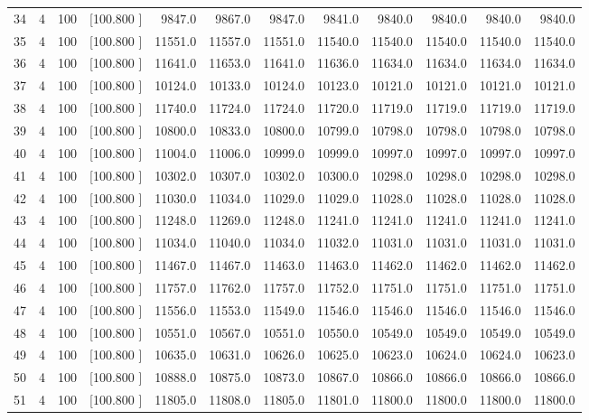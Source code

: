 \documentclass[12pt,a4paper]{article}
\begin{document}
\begin{center}
{\begin{tabular}{r r r r r r r r r r r r}
  34&  4&100&[100.800   ]&  9847.0&  9867.0&  9847.0&  9841.0&  9840.0&  9840.0&  9840.0&  9840.0\\[-0.02in]
  35&  4&100&[100.800   ]& 11551.0& 11557.0& 11551.0& 11540.0& 11540.0& 11540.0& 11540.0& 11540.0\\[-0.02in]
  36&  4&100&[100.800   ]& 11641.0& 11653.0& 11641.0& 11636.0& 11634.0& 11634.0& 11634.0& 11634.0\\[-0.02in]
  37&  4&100&[100.800   ]& 10124.0& 10133.0& 10124.0& 10123.0& 10121.0& 10121.0& 10121.0& 10121.0\\[-0.02in]
  38&  4&100&[100.800   ]& 11740.0& 11724.0& 11724.0& 11720.0& 11719.0& 11719.0& 11719.0& 11719.0\\[-0.02in]
  39&  4&100&[100.800   ]& 10800.0& 10833.0& 10800.0& 10799.0& 10798.0& 10798.0& 10798.0& 10798.0\\[-0.02in]
  40&  4&100&[100.800   ]& 11004.0& 11006.0& 10999.0& 10999.0& 10997.0& 10997.0& 10997.0& 10997.0\\[-0.02in]
  41&  4&100&[100.800   ]& 10302.0& 10307.0& 10302.0& 10300.0& 10298.0& 10298.0& 10298.0& 10298.0\\[-0.02in]
  42&  4&100&[100.800   ]& 11030.0& 11034.0& 11029.0& 11029.0& 11028.0& 11028.0& 11028.0& 11028.0\\[-0.02in]
  43&  4&100&[100.800   ]& 11248.0& 11269.0& 11248.0& 11241.0& 11241.0& 11241.0& 11241.0& 11241.0\\[-0.02in]
  44&  4&100&[100.800   ]& 11034.0& 11040.0& 11034.0& 11032.0& 11031.0& 11031.0& 11031.0& 11031.0\\[-0.02in]
  45&  4&100&[100.800   ]& 11467.0& 11467.0& 11463.0& 11463.0& 11462.0& 11462.0& 11462.0& 11462.0\\[-0.02in]
  46&  4&100&[100.800   ]& 11757.0& 11762.0& 11757.0& 11752.0& 11751.0& 11751.0& 11751.0& 11751.0\\[-0.02in]
  47&  4&100&[100.800   ]& 11556.0& 11553.0& 11549.0& 11546.0& 11546.0& 11546.0& 11546.0& 11546.0\\[-0.02in]
  48&  4&100&[100.800   ]& 10551.0& 10567.0& 10551.0& 10550.0& 10549.0& 10549.0& 10549.0& 10549.0\\[-0.02in]
  49&  4&100&[100.800   ]& 10635.0& 10631.0& 10626.0& 10625.0& 10623.0& 10624.0& 10624.0& 10623.0\\[-0.02in]
  50&  4&100&[100.800   ]& 10888.0& 10875.0& 10873.0& 10867.0& 10866.0& 10866.0& 10866.0& 10866.0\\[-0.02in]
  51&  4&100&[100.800   ]& 11805.0& 11808.0& 11805.0& 11801.0& 11800.0& 11800.0& 11800.0& 11800.0\\[-0.02in]

\end{tabular}}
\end{center}
\end{document}
